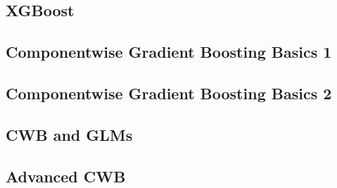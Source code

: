 \subsection{XGBoost}


\subsection{Componentwise Gradient Boosting Basics 1}


\subsection{Componentwise Gradient Boosting Basics 2}


\subsection{CWB and GLMs}


\subsection{Advanced CWB}









